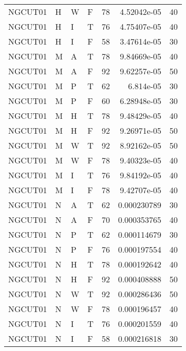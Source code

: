 \begin{table}[htb!]
{\begin{tabular}{llllrrr}
            NGCUT01  & H     & W     & F          & 78         & 4.52042e-05 & 40       \\
            NGCUT01  & H     & I     & T          & 76         & 4.75407e-05 & 40       \\
            NGCUT01  & H     & I     & F          & 58         & 3.47614e-05 & 30       \\
            NGCUT01  & M     & A     & T          & 78         & 9.84669e-05 & 40       \\
            NGCUT01  & M     & A     & F          & 92         & 9.62257e-05 & 50       \\
            NGCUT01  & M     & P     & T          & 62         & 6.814e-05   & 30       \\
            NGCUT01  & M     & P     & F          & 60         & 6.28948e-05 & 30       \\
            NGCUT01  & M     & H     & T          & 78         & 9.48429e-05 & 40       \\
            NGCUT01  & M     & H     & F          & 92         & 9.26971e-05 & 50       \\
            NGCUT01  & M     & W     & T          & 92         & 8.92162e-05 & 50       \\
            NGCUT01  & M     & W     & F          & 78         & 9.40323e-05 & 40       \\
            NGCUT01  & M     & I     & T          & 76         & 9.84192e-05 & 40       \\
            NGCUT01  & M     & I     & F          & 78         & 9.42707e-05 & 40       \\
            NGCUT01  & N     & A     & T          & 62         & 0.000230789 & 30       \\
            NGCUT01  & N     & A     & F          & 70         & 0.000353765 & 40       \\
            NGCUT01  & N     & P     & T          & 62         & 0.000114679 & 30       \\
            NGCUT01  & N     & P     & F          & 76         & 0.000197554 & 40       \\
            NGCUT01  & N     & H     & T          & 78         & 0.000192642 & 40       \\
            NGCUT01  & N     & H     & F          & 92         & 0.000408888 & 50       \\
            NGCUT01  & N     & W     & T          & 92         & 0.000286436 & 50       \\
            NGCUT01  & N     & W     & F          & 78         & 0.000196457 & 40       \\
            NGCUT01  & N     & I     & T          & 76         & 0.000201559 & 40       \\
            NGCUT01  & N     & I     & F          & 58         & 0.000216818 & 30       \\
            \hline
        \end{tabular}
    }{
    }
\end{table} 
